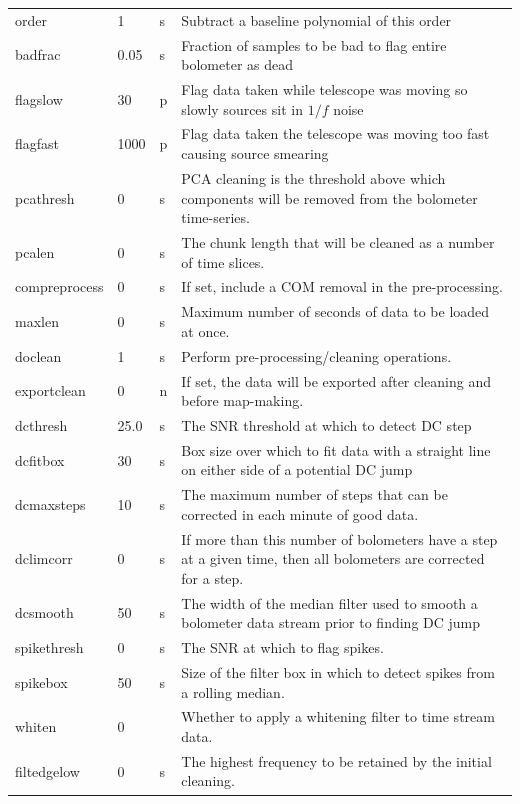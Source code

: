 \documentclass[twoside,11pt]{article}
\newenvironment{latexonly}{}{}
\renewcommand{\_}{\texttt{\symbol{95}}}
\begin{document}
\begin{latexonly}
\begin{table}
\begin{center}
\begin{footnotesize}
\begin{tabular}{|p{2.1cm}|p{0.8cm}|p{0.2cm}|p{11.2cm}|}
order & 1 &s &Subtract a baseline polynomial of this order\\
badfrac & 0.05 &s& Fraction of samples to be bad to flag entire bolometer
                        as dead\\
flagslow & 30 & p&Flag data taken while telescope was moving so slowly
                        sources sit in $1/f$ noise\\
flagfast & 1000 &p& Flag data taken the telescope was moving too fast causing source
                        smearing\\
pcathresh & 0 &s& PCA cleaning is the threshold above which components
                        will be removed from the bolometer time-series.\\
pcalen & 0 &s &The chunk length that will be cleaned as a number of time slices.\\
compreprocess& 0 &s& If set, include a COM removal in the pre-processing.\\
maxlen& 0 &s &Maximum number of seconds of data to be loaded at once.\\
doclean& 1 &s&Perform pre-processing/cleaning operations. \\
exportclean& 0 &n&If set, the data will be exported after cleaning and before map-making. \\
dcthresh & 25.0 &s& The SNR threshold at which to detect DC step\\
dcfitbox & 30 &s& Box size over which to fit data with a straight
                        line on either side of a potential DC jump\\
dcmaxsteps & 10 &s& The maximum number of steps that can be corrected
                        in each minute of good data.\\
dclimcorr & 0 &s& If more than this number of bolometers have a step at
                        a given time, then all bolometers are corrected for
                        a step.\\
dcsmooth & 50 &s& The width of the median filter used to smooth a
                        bolometer data stream prior to finding DC jump\\
spikethresh & 0 &s& The SNR at which to flag spikes.\\
spikebox & 50 &s& Size of the filter box in which to detect spikes from a rolling median.\\
whiten & 0 &&Whether to apply a whitening filter to time stream data. \\
filt\_edgelow & 0 &s&The highest frequency to be retained by the initial cleaning. \\

\end{tabular}
\end{footnotesize}
\end{center}
\end{table}
\end{latexonly}
\end{document}

